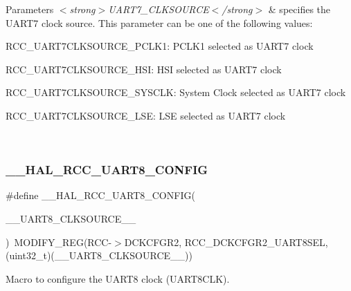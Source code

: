 \begin{DoxyParams}{Parameters}
{\em $<$strong$>$\+U\+A\+R\+T7\+\_\+\+C\+L\+K\+S\+O\+U\+R\+C\+E$<$/strong$>$} & specifies the U\+A\+R\+T7 clock source. This parameter can be one of the following values\+: \begin{DoxyItemize}
\item R\+C\+C\+\_\+\+U\+A\+R\+T7\+C\+L\+K\+S\+O\+U\+R\+C\+E\+\_\+\+P\+C\+L\+K1\+: P\+C\+L\+K1 selected as U\+A\+R\+T7 clock \item R\+C\+C\+\_\+\+U\+A\+R\+T7\+C\+L\+K\+S\+O\+U\+R\+C\+E\+\_\+\+H\+SI\+: H\+SI selected as U\+A\+R\+T7 clock \item R\+C\+C\+\_\+\+U\+A\+R\+T7\+C\+L\+K\+S\+O\+U\+R\+C\+E\+\_\+\+S\+Y\+S\+C\+LK\+: System Clock selected as U\+A\+R\+T7 clock \item R\+C\+C\+\_\+\+U\+A\+R\+T7\+C\+L\+K\+S\+O\+U\+R\+C\+E\+\_\+\+L\+SE\+: L\+SE selected as U\+A\+R\+T7 clock \end{DoxyItemize}
\\
\hline
\end{DoxyParams}
\mbox{\label{group___r_c_c_ex___exported___macros_ga2d9185e53c66b1b79d117988487093a2}} 
\subsubsection{\texorpdfstring{\_\_HAL\_RCC\_UART8\_CONFIG}{\_\_HAL\_RCC\_UART8\_CONFIG}}
{\footnotesize\ttfamily \#define \+\_\+\+\_\+\+H\+A\+L\+\_\+\+R\+C\+C\+\_\+\+U\+A\+R\+T8\+\_\+\+C\+O\+N\+F\+IG(\begin{DoxyParamCaption}\item[{}]{\+\_\+\+\_\+\+U\+A\+R\+T8\+\_\+\+C\+L\+K\+S\+O\+U\+R\+C\+E\+\_\+\+\_\+ }\end{DoxyParamCaption})~M\+O\+D\+I\+F\+Y\+\_\+\+R\+EG(R\+CC-\/$>$D\+C\+K\+C\+F\+G\+R2, R\+C\+C\+\_\+\+D\+C\+K\+C\+F\+G\+R2\+\_\+\+U\+A\+R\+T8\+S\+EL, (uint32\+\_\+t)(\+\_\+\+\_\+\+U\+A\+R\+T8\+\_\+\+C\+L\+K\+S\+O\+U\+R\+C\+E\+\_\+\+\_\+))}



Macro to configure the U\+A\+R\+T8 clock (U\+A\+R\+T8\+C\+LK). 


